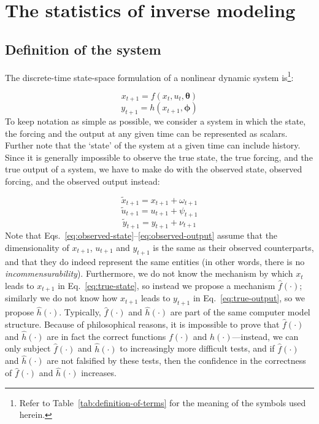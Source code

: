 \chapter{The statistics of inverse modeling}
\section{Definition of the system}


The discrete-time state-space formulation of a nonlinear dynamic system is\footnote{Refer to Table~\ref{tab:definition-of-terms} for the meaning of the symbols used herein.}:

\begin{equation}\label{eq:true-state}
x_{t+1}=f(x_t,u_t,\boldsymbol\theta)
\end{equation}
\begin{equation}\label{eq:true-output}
y_{t+1}=h(x_{t+1},\boldsymbol\phi)
\end{equation}
To keep notation as simple as possible, we consider a system in which the state, the forcing and the output at any given time can be represented as scalars. Further note that the `state' of the system at a given time can include history.
Since it is generally impossible to observe the true state, the true forcing, and the true output of a system, we have to make do with the observed state, observed forcing, and the observed output instead:

\begin{equation}\label{eq:observed-state}
\tilde{x}_{t+1}=x_{t+1} + \omega_{t+1}
\end{equation}
\begin{equation}\label{eq:observed-forcing}
\tilde{u}_{t+1}=u_{t+1} + \psi_{t+1}
\end{equation}
\begin{equation}\label{eq:observed-output}
\tilde{y}_{t+1}=y_{t+1} + \nu_{t+1}
\end{equation}
Note that Eqs.~\ref{eq:observed-state}--\ref{eq:observed-output} assume that the dimensionality of $x_{t+1}$, $u_{t+1}$ and $y_{t+1}$ is the same as their observed counterparts, and that they do indeed represent the same entities (in other words, there is no \textit{incommensurability}). Furthermore, we do not know the mechanism by which $x_t$ leads to $x_{t+1}$ in Eq.~\ref{eq:true-state}, so instead we propose a mechanism $\hat{f}(\cdot{})$; similarly we do not know how $x_{t+1}$ leads to $y_{t+1}$ in Eq.~\ref{eq:true-output}, so we propose $\hat{h}(\cdot{})$. Typically, $\hat{f}(\cdot{})$ and $\hat{h}(\cdot{})$ are part of the same computer model structure. Because of philosophical reasons, it is impossible to prove that $\hat{f}(\cdot{})$ and $\hat{h}(\cdot{})$ are in fact the correct functions $f(\cdot{})$ and $h(\cdot{})$---instead, we can only subject $\hat{f}(\cdot{})$ and $\hat{h}(\cdot{})$ to increasingly more difficult tests, and if $\hat{f}(\cdot{})$ and $\hat{h}(\cdot{})$ are not falsified by these tests, then the confidence in the correctness of $\hat{f}(\cdot{})$ and $\hat{h}(\cdot{})$ increases.


